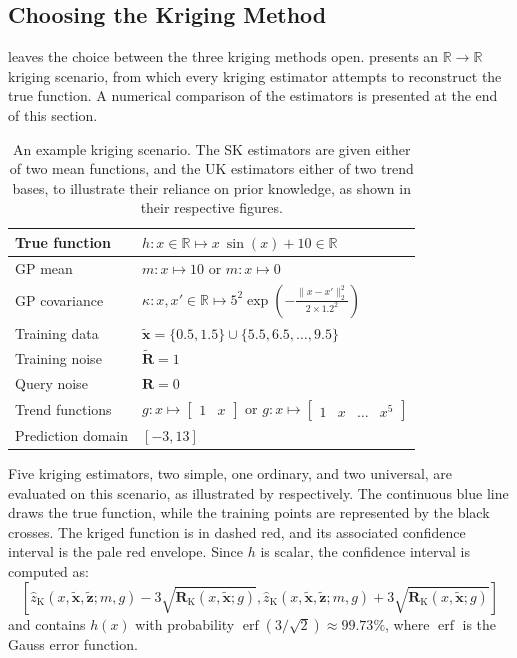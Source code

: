 \subsection{Choosing the Kriging Method}\label{sec:kriging_method}

 leaves the choice between the three kriging methods open.  presents an $\mathbb{R}\to\mathbb{R}$ kriging scenario, from which every kriging estimator attempts to reconstruct the true function. A numerical comparison of the estimators is presented at the end of this section.

\begin{table}[!htb]
	\centering\begin{tabular}{|l|l|}\hline
		True function&$h:x\in\mathbb{R}\mapsto x\:\sin(x)+10\in\mathbb{R}$\\\hline
		GP mean&$m:x\mapsto10$ or $m:x\mapsto0$\\\hline
		GP covariance&$\displaystyle \kappa:x,x'\in\mathbb{R}\mapsto5^2\exp\left(-\frac{\|x-x'\|_2^2}{2\times1.2^2}\right)$\rule[-6mm]{0pt}{14mm}\\\hline
		Training data&$\tilde{\mathbf{x}}=\{0.5,1.5\}\cup\{5.5,6.5,\dots,9.5\}$\\\hline
		Training noise&$\tilde{\mathbf{R}}=1$\\\hline
		Query noise&$\mathbf{R}=0$\\\hline
		Trend functions&$g:x\mapsto\begin{bmatrix}1&x\end{bmatrix}$ or $\displaystyle g:x\mapsto\begin{bmatrix}1&x&\dots&x^5\end{bmatrix}$\rule[-5mm]{0pt}{12mm}\\\hline
		Prediction domain&$[-3,13]$\\\hline
	\end{tabular}
	\caption{An example kriging scenario. The SK estimators are given either of two mean functions, and the UK estimators either of two trend bases, to illustrate their reliance on prior knowledge, as shown in their respective figures.}\label{tab:kriging_scenario}
\end{table}

Five kriging estimators, two simple, one ordinary, and two universal, are evaluated on this scenario, as illustrated by  respectively. The continuous blue line draws the true function, while the training points are represented by the black crosses. The kriged function is in dashed red, and its associated confidence interval is the pale red envelope. Since $h$ is scalar, the confidence interval is computed as:
\begin{equation}
	\left[\hat{z}_{\mathrm{K}}(x,\tilde{\mathbf{x}},\tilde{\mathbf{z}};m,g)-3\sqrt{\mathbf{R}_{\mathrm{K}}(x,\tilde{\mathbf{x}};g)},\hat{z}_{\mathrm{K}}(x,\tilde{\mathbf{x}},\tilde{\mathbf{z}};m,g)+3\sqrt{\mathbf{R}_{\mathrm{K}}(x,\tilde{\mathbf{x}};g)}\right]
\end{equation}
and contains $h(x)$ with probability $\operatorname{erf}(3/\sqrt{2})\approx99.73\%$, where $\operatorname{erf}$ is the Gauss error function.

